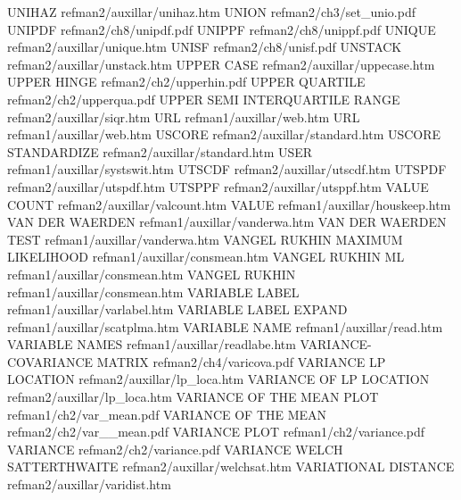 UNIHAZ                                  refman2/auxillar/unihaz.htm
UNION                                   refman2/ch3/set_unio.pdf
UNIPDF                                  refman2/ch8/unipdf.pdf
UNIPPF                                  refman2/ch8/unippf.pdf
UNIQUE                                  refman2/auxillar/unique.htm
UNISF                                   refman2/ch8/unisf.pdf
UNSTACK                                 refman2/auxillar/unstack.htm
UPPER CASE                              refman2/auxillar/uppecase.htm
UPPER HINGE                             refman2/ch2/upperhin.pdf
UPPER QUARTILE                          refman2/ch2/upperqua.pdf
UPPER SEMI INTERQUARTILE RANGE          refman2/auxillar/siqr.htm
URL                                     refman1/auxillar/web.htm
URL                                     refman1/auxillar/web.htm
USCORE                                  refman2/auxillar/standard.htm
USCORE STANDARDIZE                      refman2/auxillar/standard.htm
USER                                    refman1/auxillar/systswit.htm
UTSCDF                                  refman2/auxillar/utscdf.htm
UTSPDF                                  refman2/auxillar/utspdf.htm
UTSPPF                                  refman2/auxillar/utsppf.htm
VALUE COUNT                             refman2/auxillar/valcount.htm
VALUE                                   refman1/auxillar/houskeep.htm
VAN DER WAERDEN                         refman1/auxillar/vanderwa.htm
VAN DER WAERDEN TEST                    refman1/auxillar/vanderwa.htm
VANGEL RUKHIN MAXIMUM LIKELIHOOD        refman1/auxillar/consmean.htm
VANGEL RUKHIN ML                        refman1/auxillar/consmean.htm
VANGEL RUKHIN                           refman1/auxillar/consmean.htm
VARIABLE LABEL                          refman1/auxillar/varlabel.htm
VARIABLE LABEL EXPAND                   refman1/auxillar/scatplma.htm
VARIABLE NAME                           refman1/auxillar/read.htm
VARIABLE NAMES                          refman1/auxillar/readlabe.htm
VARIANCE-COVARIANCE MATRIX              refman2/ch4/varicova.pdf
VARIANCE LP LOCATION                    refman2/auxillar/lp_loca.htm
VARIANCE OF LP LOCATION                 refman2/auxillar/lp_loca.htm
VARIANCE OF THE MEAN PLOT               refman1/ch2/var_mean.pdf
VARIANCE OF THE MEAN                    refman2/ch2/var__mean.pdf
VARIANCE PLOT                           refman1/ch2/variance.pdf
VARIANCE                                refman2/ch2/variance.pdf
VARIANCE WELCH SATTERTHWAITE            refman2/auxillar/welchsat.htm
VARIATIONAL DISTANCE                    refman2/auxillar/varidist.htm
